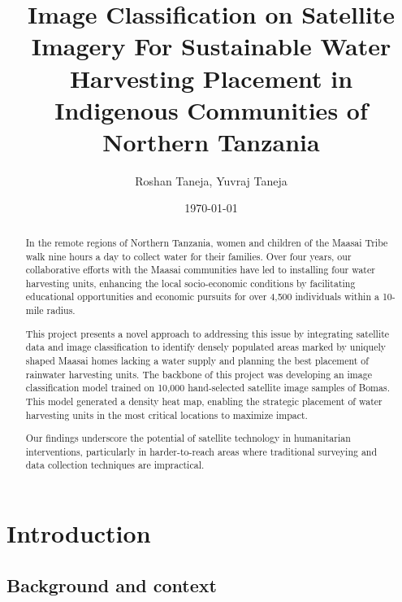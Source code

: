 \documentclass{article}
\title{Image Classification on Satellite Imagery For Sustainable Water Harvesting Placement in Indigenous Communities of Northern Tanzania}
\author{Roshan Taneja, Yuvraj Taneja}
\date{\today}
\begin{document}
\maketitle

\begin{abstract}

In the remote regions of Northern Tanzania, women and children of the Maasai Tribe walk nine hours a day to collect water for their families. Over four years, our collaborative efforts with the Maasai communities have led to installing four water harvesting units, enhancing the local socio-economic conditions by facilitating educational opportunities and economic pursuits for over 4,500 individuals within a 10-mile radius.

This project presents a novel approach to addressing this issue by integrating satellite data and image classification to identify densely populated areas marked by uniquely shaped Maasai homes lacking a water supply and planning the best placement of rainwater harvesting units. The backbone of this project was developing an image classification model trained on 10,000 hand-selected satellite image samples of Bomas. This model generated a density heat map, enabling the strategic placement of water harvesting units in the most critical locations to maximize impact.

Our findings underscore the potential of satellite technology in humanitarian interventions, particularly in harder-to-reach areas where traditional surveying and data collection techniques are impractical.
    
\end{abstract}


\section{Introduction}

\subsection{Background and context}
\end{document}
